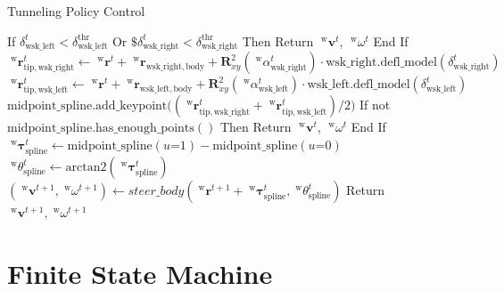 \begin{algorithm}
    \caption{Tunneling Policy Control}
    \label{alg:tunneling_policy}
    \begin{algorithmic}
        \State If \(\delta_{\mathrm{wsk\_left}}^{t} < \delta_{\mathrm{wsk\_left}}^{\mathrm{thr}}\) Or \(\$\delta_{\mathrm{wsk\_right}}^{t} < \delta_{\mathrm{wsk\_right}}^{\mathrm{thr}}\) Then
        \State \quad Return \(\;^{\mathrm{w}}\boldsymbol{v}^{t}\), \(\;^{\mathrm{w}}\omega^{t}\)
        \State End If
        \State
        \State \(\;^{\mathrm{w}}\boldsymbol{r}_{\mathrm{tip, wsk\_right}}^{t} \gets \;^{\mathrm{w}}\boldsymbol{r}^{t} + \;^{\mathrm{w}}\boldsymbol{r}_{\mathrm{wsk\_right, body}} + \boldsymbol{R}_{xy}^{2}(\; ^{\mathrm{w}}\alpha_{\mathrm{wsk\_right}}^{t}) \cdot \mathrm{wsk\_right.defl\_model}(\delta_{\mathrm{wsk\_right}}^{t})\)
        \State \(\;^{\mathrm{w}}\boldsymbol{r}_{\mathrm{tip, wsk\_left}}^{t} \gets \;^{\mathrm{w}}\boldsymbol{r}^{t} + \;^{\mathrm{w}}\boldsymbol{r}_{\mathrm{wsk\_left, body}} + \boldsymbol{R}_{xy}^{2}(\; ^{\mathrm{w}}\alpha_{\mathrm{wsk\_left}}^{t}) \cdot \mathrm{wsk\_left.defl\_model}(\delta_{\mathrm{wsk\_left}}^{t})\)
        \State \(\mathrm{midpoint\_spline.add\_keypoint}\big((\;^{\mathrm{w}}\boldsymbol{r}_{\mathrm{tip, wsk\_right}}^{t} + \;^{\mathrm{w}}\boldsymbol{r}_{\mathrm{tip, wsk\_left}}^{t}) / 2\big)\)
        \State If not \(\mathrm{midpoint\_spline.has\_enough\_points()}\) Then
        \State \quad Return \(\;^{\mathrm{w}}\boldsymbol{v}^{t}\), \(\;^{\mathrm{w}}\omega^{t}\)
        \State End If
        \State
        \State \(\;^{\mathrm{w}}\boldsymbol{\tau}_{\mathrm{spline}}^{t} \gets \mathrm{midpoint\_spline}(u\mathord{=}1) - \mathrm{midpoint\_spline}(u\mathord{=}0)\)
        \State \(\;^{\mathrm{w}}\theta_{\mathrm{spline}}^{t} \gets \mathrm{arctan2}(\;^{\mathrm{w}}\boldsymbol{\tau}_{\mathrm{spline}}^{t})\)
        \State
        \State \((\;^{\mathrm{w}}\boldsymbol{v}^{t+1}, \;^{\mathrm{w}}\omega^{t+1}) \gets steer\_body(\;^{\mathrm{w}}\boldsymbol{r}^{t+1} + \;^{\mathrm{w}}\boldsymbol{\tau}_{\mathrm{spline}}^{t},\;^{\mathrm{w}}\theta_{\mathrm{spline}}^{t})\)
        \State Return \(\;^{\mathrm{w}}\boldsymbol{v}^{t+1}, \;^{\mathrm{w}}\omega^{t+1}\)
    \end{algorithmic}
\end{algorithm}


\section{Finite State Machine}

